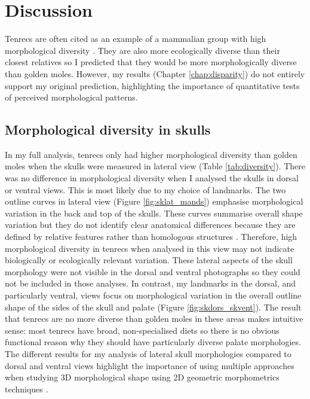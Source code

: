 \chapter{Discussion}
\label{chap:discussion}


	Tenrecs are often cited as an example of a mammalian group with high morphological diversity \citep{Olson2013, Soarimalala2011, Eisenberg1969}. They are also more ecologically diverse than their closest relatives \citep{Soarimalala2011, Bronner1995} so I predicted that they would be more morphologically diverse than golden moles. However, my results (Chapter \ref{chap:disparity}) do not entirely support my original prediction, highlighting the importance of quantitative tests of perceived morphological patterns.

\section{Morphological diversity in skulls}


	In my full analysis, tenrecs only had higher morphological diversity than golden moles when the skulls were measured in lateral view (Table \ref{tab:diversity}). There was no difference in morphological diversity when I analysed the skulls in dorsal or ventral views. This is most likely due to my choice of landmarks. The two outline curves in lateral view (Figure \ref{fig:sklat_mands}) emphasise morphological variation in the back and top of the skulls. These curves summarise overall shape variation but they do not identify clear anatomical differences because they are defined by relative features rather than homologous structures \citep{Zelditch2012}. Therefore, high morphological diversity in tenrecs when analysed in this view may not indicate biologically or ecologically relevant variation.	
	These lateral aspects of the skull morphology were not visible in the dorsal and ventral photographs so they could not be included in those analyses. In contrast, my landmarks in the dorsal, and particularly ventral, views focus on morphological variation in the overall outline shape of the sides of the skull and palate (Figure \ref{fig:skdors_skvent}). The result that tenrecs are no more diverse than golden moles in these areas makes intuitive sense: most tenrecs have broad, non-specialised diets \citep{Olson2013} so there is no obvious functional reason why they should have particularly diverse palate morphologies.
	The different results for my analysis of lateral skull morphologies compared to dorsal and ventral views highlight the importance of using multiple approaches when studying 3D morphological shape using 2D geometric morphometrics techniques \citep{Arnqvist1998}.

